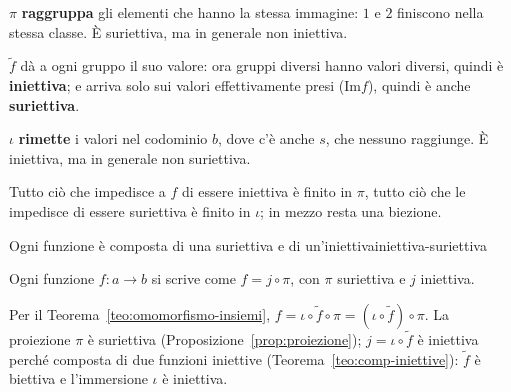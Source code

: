 \begin{spiegazione}
\begin{center}
    \end{center}
    \begin{passi}
        \item $\pi$ \textbf{raggruppa} gli elementi che hanno la stessa immagine: $1$ e $2$ finiscono nella stessa classe.
              È suriettiva, ma in generale non iniettiva.
        \item $\tilde{f}$ dà a ogni gruppo il suo valore: ora gruppi diversi hanno valori diversi, quindi è \textbf{iniettiva}; e
              arriva solo sui valori effettivamente presi ($\mathrm{Im} f$), quindi è anche \textbf{suriettiva}.
        \item $\iota$ \textbf{rimette} i valori nel codominio $b$, dove c'è anche $s$, che nessuno raggiunge. È iniettiva, ma
              in generale non suriettiva.
    \end{passi}
    Tutto ciò che impedisce a $f$ di essere iniettiva è finito in $\pi$, tutto ciò che le impedisce di essere suriettiva è
    finito in $\iota$; in mezzo resta una biezione.
\end{spiegazione}

\begin{concetto}
\begin{Corollario}{Ogni funzione è composta di una suriettiva e di un'iniettiva}{iniettiva-suriettiva}
    \begin{prerequisiti}
    \end{prerequisiti}
    Ogni funzione $f \colon a \to b$ si scrive come $f = j \circ \pi$, con $\pi$ suriettiva e $j$ iniettiva.
\end{Corollario}
\begin{dimostrazione}
    Per il Teorema~\ref{teo:omomorfismo-insiemi}, $f = \iota \circ \tilde{f} \circ \pi = (\iota \circ \tilde{f}) \circ \pi$. La proiezione
    $\pi$ è suriettiva (Proposizione~\ref{prop:proiezione}); $j = \iota \circ \tilde{f}$ è iniettiva perché composta di due funzioni
    iniettive (Teorema~\ref{teo:comp-iniettive}): $\tilde{f}$ è biettiva e l'immersione $\iota$ è iniettiva.
\end{dimostrazione}
\end{concetto}


